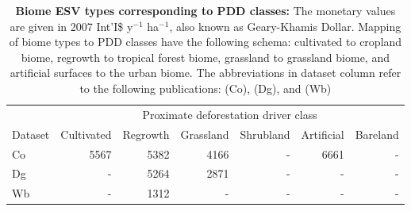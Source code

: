 		\begin{table}[ht]
			\centering
			\caption[Biome ESV types corresponding to PDD classes]{\textbf{Biome ESV types corresponding to PDD classes:} The monetary values are given in 2007 Int'I\$ y$^{-1}$ ha$^{-1}$, also known as Geary-Khamis Dollar. Mapping of biome types to PDD classes have the following schema: cultivated to cropland biome, regrowth to tropical forest biome, grassland to grassland biome, and artificial surfaces to the urban biome. The abbreviations in dataset column refer to the following publications: \citet{Costanza2014} (Co), \citet{Groot2012} (Dg), and \citet{Siikamaki2015} (Wb)}
			\label{tab:esv_mapping}
			\begin{tabular}{lrrrrrr}
				\hline
				& \multicolumn{6}{c}{Proximate deforestation driver class} \\\cline{2-7}
				Dataset & Cultivated & Regrowth & Grassland & Shrubland &  Artificial & Bareland \\
				\hline
				Co & 5567 & 5382 & 4166 & - & 6661 & - \\
				Dg & - & 5264 & 2871 & - & - & - \\
				Wb & - & 1312 & - & - & - & - \\
				\hline
			\end{tabular}
		\end{table}

